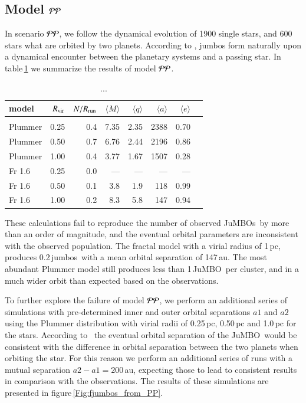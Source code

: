 \documentclass[aa]{lib/aa}
\newcommand{\jumbo}{\mbox{JuMBO}}
\newcommand{\jumbos}{\mbox{JuMBOs}}
\begin{document}
\subsection{Model ${\cal PP}$}

In scenario ${\cal PP}$, we follow the dynamical evolution of 1900
single stars, and 600 stars what are orbited by two planets.  According
to \cite{2023arXiv231006016W}, jumbos form naturally upon a dynamical
encounter between the planetary systems and a passing star.  In
table\,\ref{Tab:model_PP} we summarize the results of model ${\cal
  PP}$.

\begin{table}
 \caption{...}
 \label{Tab:model_PP}
 \centering 
 \begin{tabular}{lrrrrrrr}
 \hline\hline
model &$R_{\rm vir}$ & $N/R_{\rm run}$ & $\langle M \rangle$ & $\langle q \rangle$ & $\langle a \rangle$ & $\langle e \rangle$ \\
        \hline \vspace{-0.75em}\\
 Plummer & 0.25 & 0.4 &  7.35	&2.35&	2388 &0.70	\\
 Plummer & 0.50 & 0.7 & 6.76    & 2.44 & 2196 & 0.86 \\
 Plummer & 1.00 & 0.4 & 3.77    & 1.67 & 1507 & 0.28\\
 Fr 1.6  & 0.25 & 0.0 &   ---   & ---  &  --- & --- \\			
 Fr 1.6  & 0.50 & 0.1 & 3.8     & 1.9 & 118 & 0.99\\
 Fr 1.6  & 1.00 &0.2  & 8.3     & 5.8 & 147 & 0.94 \\ 
 \hline
 \end{tabular}
\end{table}

These calculations fail to reproduce the number of observed \jumbos\,
by more than an order of magnitude, and the eventual orbital parameters
are inconsistent with the observed population.  The fractal model with
a virial radius of 1\,pc, produces 0.2\,jumbos\ with a mean orbital
separation of 147\,au. The most abundant Plummer model still produces
less than 1\,\jumbo\, per cluster, and in a much wider orbit than
expected based on the observations.

To further explore the failure of model ${\cal PP}$, we perform an
additional series of simulations with pre-determined inner and outer
orbital separations $a1$ and $a2$ using the Plummer distribution with
virial radii of 0.25\,pc, 0.50\,pc and 1.0\,pc for the stars.
According to \cite{2023arXiv231006016W}\, the eventual orbital
separation of the \jumbo\, would be consistent with the difference in
orbital separation between the two planets when orbiting the star. For
this reason we perform an additional series of runs with a mutual
separation $a2-a1 = 200$\,au, expecting those to lead to consistent
results in comparison with the observations.  The results of these
simulations are presented in figure\,\ref{Fig:fjumbos_from_PP}.
\end{document}
